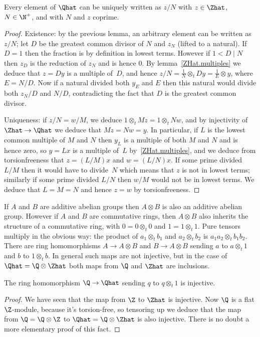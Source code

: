 \begin{lemma}
    \label{QHat.lowestTerms}
    \leanok
    Every element of $\Qhat$ can be uniquely written as $z/N$ with $z\in\Zhat$, $N\in\N^+$,
    and with $N$ and $z$ coprime.
\end{lemma}
\begin{proof}
    Existence: by the previous lemma, an arbitrary element can be written as $z/N$; let $D$
    be the greatest common divisor of $N$ and $z_N$ (lifted to a natural). If $D=1$
    then the fraction is by definition in lowest terms. However if $1<D\mid N$ then $z_D$
    is the reduction of $z_N$ and is hence 0. By lemma~\ref{ZHat.multiples} we deduce that $z=Dy$
    is a multiple of~$D$, and hence $z/N=\frac{1}{N}\otimes_tDy=\frac{1}{E}\otimes y$, where
    $E=N/D$. Now if a natural divided both $y_E$ and $E$ then this natural would divide both $z_N/D$
    and $N/D$, contradicting the fact that $D$ is the greatest common divisor.

    Uniqueness: if $z/N=w/M$, we deduce $1\otimes_t Mz=1\otimes_t Nw$,
    and by injectivity of $\Zhat\to\Qhat$ we deduce that $Mz=Nw=y$.
    In particular, if $L$ is the lowest common multiple of $M$ and $N$ then $y_L$ is a multiple of both $M$ and $N$ and is
    hence zero, so $y=Lx$ is a multiple of~$L$ by~\ref{ZHat.multiples}, and we deduce
    from torsionfreeness that $z=(L/M)x$ and $w=(L/N)x$. If some prime divided $L/M$
    then it would have to divide~$N$ which means that $z$ is not in lowest terms;
    similarly if some prime divided $L/N$ then $w/M$ would not be in lowest terms.
    We deduce that $L=M=N$ and hence $z=w$ by torsionfreeness.
\end{proof}

If $A$ and $B$ are additive abelian groups then $A\otimes B$ is also an additive abelian group.
However if $A$ and $B$ are commutative rings, then $A\otimes B$ also inherits the structure
of a commutative ring, with $0=0\otimes_t 0$ and $1=1\otimes_t 1$. Pure tensors multiply in the
obvious way: the product of $a_1\otimes_t b_1$ and $a_2\otimes_t b_2$ is $a_1a_2\otimes_t b_1b_2.$
There are ring homomorphisms $A\to A\otimes B$ and $B\to A\otimes B$ sending $a$ to $a\otimes_t 1$
and $b$ to $1\otimes_t b$. In general such maps are not injective, but in the case of
$\Qhat=\Q\otimes\Zhat$ both maps from $\Q$ and $\Zhat$ are inclusions.

\begin{lemma}
    \label{QHat.injective_rat}
    \leanok
    The ring homomorphism $\Q\to\Qhat$ sending $q$ to $q\otimes_t 1$
    is injective.
\end{lemma}
\begin{proof} \leanok
    We have seen that the map from $\Z$ to $\Zhat$ is
    injective. Now $\Q$ is a flat $\Z$-module, because it's
    torsion-free, so tensoring up we deduce that the map
    from $\Q=\Q\otimes\Z$ to $\Qhat=\Q\otimes\Zhat$ is also injective.
    There is no doubt a more elementary proof of this fact.
\end{proof}

